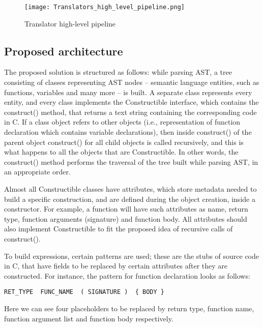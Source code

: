 \begin{figure}[h!]
    \centering
    \texttt{[image: Translators\_high\_level\_pipeline.png]}
    \caption{Translator high-level pipeline}
    \label{fig:plan}
\end{figure}

\subsection{Proposed architecture}
The proposed solution is structured as follows: while parsing AST, a tree consisting of classes representing AST nodes -- semantic language entities, such as functions, variables and many more -- is built.
A separate class represents every entity, and every class implements the Constructible interface, which contains the construct() method, that returns a text string containing the corresponding code in C. If a class object refers to other objects (i.e., representation of function declaration which contains variable declarations), then inside construct() of the parent object construct() for all child objects is called recursively, and this is what happens to all the objects that are Constructible. In other words, the construct() method performs the traversal of the tree built while parsing AST, in an appropriate order.

Almost all Constructible classes have attributes, which store metadata needed to build a specific construction, and are defined during the object creation, inside a constructor. For example, a function will have such attributes as name, return type, function arguments (signature) and function body. All attributes should also implement Constructible to fit the proposed idea of recursive calls of construct().

To build expressions, certain patterns are used; these are the stubs of source code in C, that have fields to be replaced by certain attributes after they are constructed. For instance, the pattern for function declaration looks as follows:

\begin{lstlisting}[numbers=none]
    RET_TYPE  FUNC_NAME  ( SIGNATURE )  { BODY }
\end{lstlisting}
Here we can see four placeholders to be replaced by return type, function name, function argument list and function body respectively.

